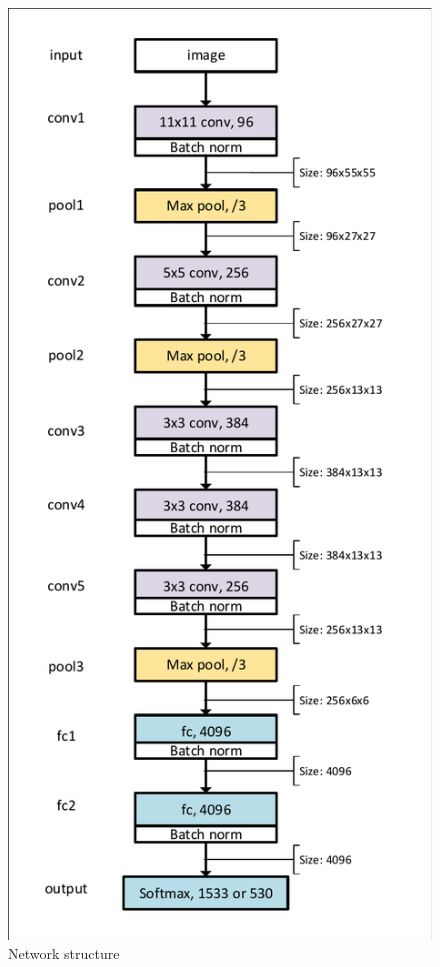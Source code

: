 \begin{figure}[h]
    \centering
    \includegraphics[width=\linewidth]{./figures/network.pdf}
    \caption{Network structure}
    \label{fig:net_structure}
\end{figure}

